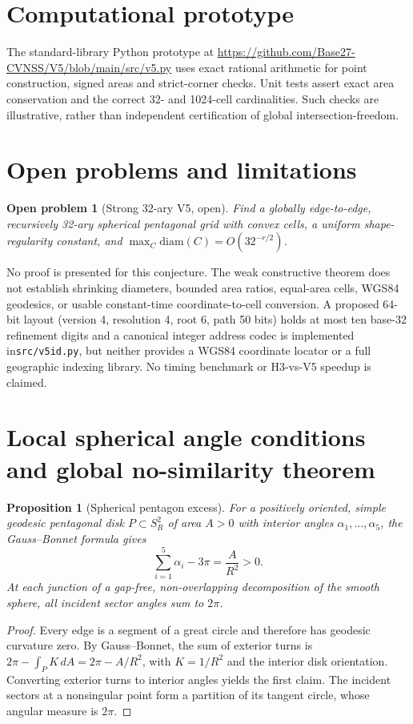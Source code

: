 \documentclass[11pt,a4paper]{article}
\newtheorem{proposition}{Proposition}
\newtheorem{conjecture}{Open problem}
\begin{document}
\section{Computational prototype}
The standard-library Python prototype at \url{https://github.com/Base27-CVNSS/V5/blob/main/src/v5.py}
uses exact rational arithmetic for point construction, signed
areas and strict-corner checks. Unit tests assert exact area conservation
and the correct 32- and 1024-cell cardinalities. Such checks are
illustrative, rather than independent certification of global
intersection-freedom.

\section{Open problems and limitations}
\begin{conjecture}[Strong 32-ary V5, open]
Find a globally edge-to-edge, recursively 32-ary spherical
pentagonal grid with convex cells, a uniform shape-regularity
constant, and $\max_C \mathrm{diam}(C)=O(32^{-r/2})$.
\end{conjecture}
No proof is presented for this conjecture. The weak constructive
theorem does not establish shrinking diameters, bounded area ratios,
equal-area cells, WGS84 geodesics, or usable constant-time
coordinate-to-cell conversion. A proposed 64-bit layout
(version 4, resolution 4, root 6, path 50 bits) holds at most
ten base-32 refinement digits and a canonical integer address codec is implemented in\texttt{src/v5id.py}, but neither provides a WGS84 coordinate locator or a full geographic indexing library.
No timing benchmark or H3-vs-V5 speedup is claimed.


\section{Local spherical angle conditions and global no-similarity theorem}
\begin{proposition}[Spherical pentagon excess]
For a positively oriented, simple geodesic pentagonal disk
$P\subset S^2_R$ of area $A>0$ with interior angles
$\alpha_1,\ldots,\alpha_5$, the Gauss--Bonnet formula gives
\begin{equation}
\sum_{i=1}^5\alpha_i-3\pi=\frac{A}{R^2}>0.
\end{equation}
At each junction of a gap-free, non-overlapping decomposition of the
smooth sphere, all incident sector angles sum to $2\pi$.
\end{proposition}
\begin{proof}
Every edge is a segment of a great circle and therefore has
geodesic curvature zero. By Gauss--Bonnet, the sum of exterior turns
is $2\pi-\int_P K\,dA=2\pi-A/R^2$, with
$K=1/R^2$ and the interior disk orientation.
Converting exterior turns to interior angles yields the first claim.
The incident sectors at a nonsingular point form a partition of its
tangent circle, whose angular measure is $2\pi$.
\end{proof}
\end{document}
